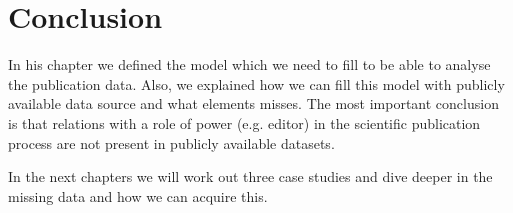 \documentclass{ou-report}
\begin{document}










\section{Conclusion}
In his chapter we defined the model which we need to fill to be able to 
analyse the publication data. Also, we explained how we can fill this model
with publicly available data source and what elements misses. The most important 
conclusion is that relations with a role of power (e.g. editor) in the scientific publication 
process are not present in publicly available datasets.

In the next chapters we will work out three case studies and dive deeper in 
the missing data and how we can acquire this.

\end{document}
